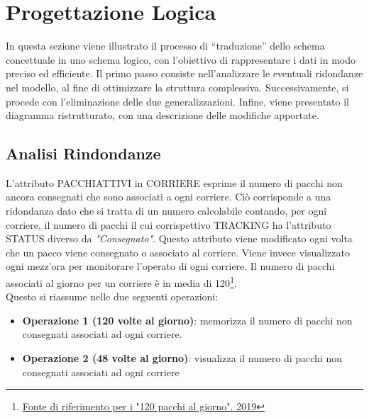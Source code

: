 \section{Progettazione Logica}

In questa sezione viene illustrato il processo di “traduzione” dello schema concettuale in uno schema logico, con l’obiettivo di rappresentare i dati in modo preciso
ed efficiente. Il primo passo consiste nell’analizzare le eventuali ridondanze nel modello, al fine di ottimizzare la struttura complessiva. Successivamente, si procede
con l’eliminazione delle due generalizzazioni. Infine, viene presentato il diagramma
ristrutturato, con una descrizione delle modifiche apportate.

\subsection{Analisi Rindondanze}

L'attributo PACCHIATTIVI in CORRIERE esprime il numero di pacchi non ancora consegnati che sono associati a ogni corriere. Ciò corrisponde a una ridondanza dato che si tratta di un numero calcolabile contando, per ogni corriere, il numero di pacchi il cui corrispettivo TRACKING ha l'attributo STATUS diverso da \textit{"Consegnato"}.
Questo attributo viene modificato ogni volta che un pacco viene consegnato o associato al corriere. Viene invece visualizzato ogni mezz'ora per monitorare l'operato di ogni corriere. Il numero di pacchi associati al giorno per un corriere è in media di 120\footnote{\href{https://www.dire.it/26-02-2019/301816-video-a-milano-la-rabbia-dei-corrieri-di-amazon-quattro-minuti-a-consegna-troppo-pochi/}{Fonte di riferimento per i "120 pacchi al giorno". 2019}}.\\
Questo si riassume nelle due seguenti operazioni:
\begin{itemize}
    \item \textbf{Operazione 1 (120 volte al giorno)}: memorizza il numero di pacchi non consegnati associati ad ogni corriere.
    \item \textbf{Operazione 2 (48 volte al giorno)}: visualizza il numero di pacchi non consegnati associati ad ogni corriere
\end{itemize}


